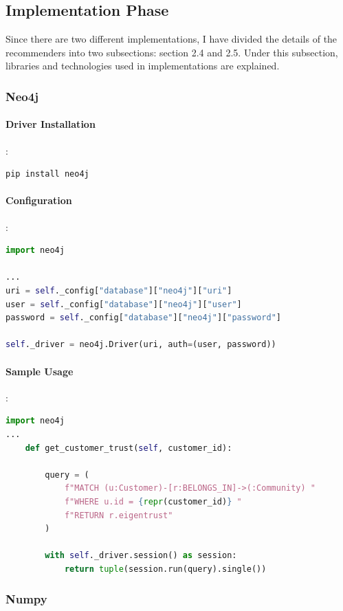 \documentclass[12pt]{article}
\begin{document}
\subsection{Implementation Phase}
Since there are two different implementations, I have divided the details of the recommenders into two subsections: section 2.4 and 2.5. Under this subsection, libraries and technologies used in implementations are explained.
\subsubsection{Neo4j}
\paragraph{Driver Installation}:
\begin{lstlisting}[language=bash]
pip install neo4j
\end{lstlisting}

\paragraph{Configuration}:
\begin{lstlisting}[language=python]
import neo4j

...
uri = self._config["database"]["neo4j"]["uri"]
user = self._config["database"]["neo4j"]["user"]
password = self._config["database"]["neo4j"]["password"]

self._driver = neo4j.Driver(uri, auth=(user, password))

\end{lstlisting}

\paragraph{Sample Usage}:
\begin{lstlisting}[language=python, caption=Neo4j cypher example]
import neo4j
...
    def get_customer_trust(self, customer_id):

		query = (
			f"MATCH (u:Customer)-[r:BELONGS_IN]->(:Community) "
			f"WHERE u.id = {repr(customer_id)} "
			f"RETURN r.eigentrust"
		)

		with self._driver.session() as session:
			return tuple(session.run(query).single())

\end{lstlisting}

\subsubsection{Numpy}
\end{document}
